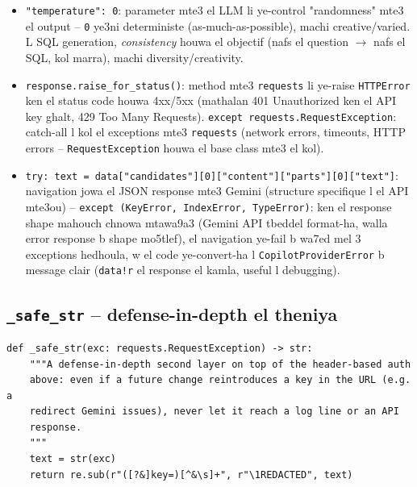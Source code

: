\documentclass[11pt,a4paper]{report}
\DeclareRobustCommand{\code}[1]{\texttt{#1}}
\begin{document}
\begin{itemize}
  \item \code{"temperature": 0}: parameter mte3 el LLM li ye-control
        "randomness" mte3 el output -- \code{0} ye3ni deterministe
        (as-much-as-possible), machi creative/varied. L SQL generation,
        \emph{consistency} houwa el objectif (nafs el question $\to$
        nafs el SQL, kol marra), machi diversity/creativity.
  \item \code{response.raise\_for\_status()}: method mte3 \code{requests}
        li ye-raise \code{HTTPError} ken el status code houwa 4xx/5xx
        (mathalan 401 Unauthorized ken el API key ghalt, 429 Too Many
        Requests). \code{except requests.RequestException}: catch-all
        l kol el exceptions mte3 \code{requests} (network errors,
        timeouts, HTTP errors -- \code{RequestException} houwa el
        base class mte3 el kol).
  \item \code{try: text = data["candidates"][0]["content"]["parts"][0]["text"]}:
        navigation jowa el JSON response mte3 Gemini (structure specifique
        l el API mte3ou) -- \code{except (KeyError, IndexError, TypeError)}:
        ken el response shape mahouch chnowa mtawa9a3 (Gemini API tbeddel
        format-ha, walla error response b shape mo5tlef), el navigation
        ye-fail b wa7ed mel 3 exceptions hedhoula, w el code ye-convert-ha
        l \code{CopilotProviderError} b message clair (\code{data!r}
        el response el kamla, useful l debugging).
\end{itemize}

\subsection{\code{\_safe\_str} -- defense-in-depth el theniya}

\begin{lstlisting}[style=pystyle]
def _safe_str(exc: requests.RequestException) -> str:
    """A defense-in-depth second layer on top of the header-based auth
    above: even if a future change reintroduces a key in the URL (e.g. a
    redirect Gemini issues), never let it reach a log line or an API
    response.
    """
    text = str(exc)
    return re.sub(r"([?&]key=)[^&\s]+", r"\1REDACTED", text)
\end{lstlisting}
\end{document}
